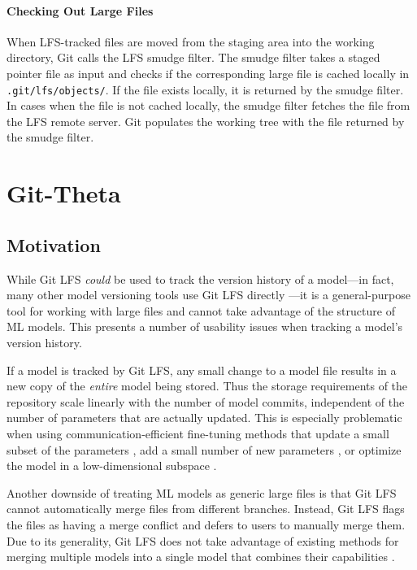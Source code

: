 \documentclass[nohyperref]{article}
\def\code#1{\texttt{#1}}
\theoremstyle{plain}
\theoremstyle{definition}
\theoremstyle{remark}
\begin{document}
\paragraph{Checking Out Large Files}
When LFS-tracked files are moved from the staging area into the working directory, Git calls the LFS smudge filter. The smudge filter takes a staged pointer file as input and checks if the corresponding large file is cached locally in \code{.git/lfs/objects/}. If the file exists locally, it is returned by the smudge filter. In cases when the file is not cached locally, the smudge filter fetches the file from the LFS remote server. Git populates the working tree with the file returned by the smudge filter.

\section{Git-Theta} \label{sec:git_theta}
\subsection{Motivation}
While Git LFS \textit{could} be used to track the version history of a model---in fact, many other model versioning tools use Git LFS directly \cite{TODO}---it is a general-purpose tool for working with large files and cannot take advantage of the structure of ML models. This presents a number of usability issues when tracking a model's version history. 

If a model is tracked by Git LFS, any small change to a model file results in a new copy of the \emph{entire} model being stored. Thus the storage requirements of the repository scale linearly with the number of model commits, independent of the number of parameters that are actually updated. This is especially problematic when using communication-efficient fine-tuning methods that update a small subset of the parameters \cite{sung2021sparse,guo2020diffpruning,zaken2021bitfit}, add a small number of new parameters \cite{liu2022tfew,hu2021lora,houlsby2019adapter,lester2021tuning,li2021prefix,mahabadi2021compacter}, or optimize the model in a low-dimensional subspace \cite{aghajanyan2020intrinsic}.

Another downside of treating ML models as generic large files is that Git LFS cannot automatically merge files from different branches. Instead, Git LFS flags the files as having a merge conflict and defers to users to manually merge them. Due to its generality, Git LFS does not take advantage of existing methods for merging multiple models into a single model that combines their capabilities \cite{matena2021merging,wortsman2021robust}.
\end{document}
